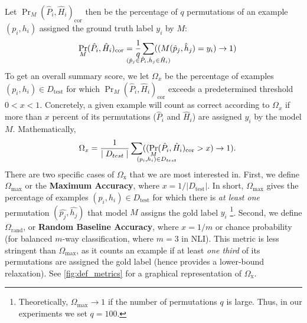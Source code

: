 \documentclass[letterpaper, 12pt]{report}
\begin{document}
Let $\Pr_{M}(\hat{P}_i, \hat{H}_i)_{\text{cor}}$ then be the percentage of $q$ permutations of an example $(p_i, h_i)$ assigned the ground truth label $y_i$ by $M$:
    \begin{align}
    &&\Pr_{M}(\hat{P}_i, \hat{H}_i)_{\text{cor}} =
    \frac{1}{q}\sum_{\mathclap{(\hat{p}_j \in \hat{P}_i, \hat{h}_j \in \hat{H}_i)}}((M(\hat{p}_j, \hat{h}_j) = y_i) \rightarrow 1)
    \end{align}
To get an overall summary score, we let $\Omega_x$ be the percentage of examples $(p_i, h_i) \in D_{\text{test}}$ for which $\Pr_{M}(\hat{P}_i, \hat{H}_i)_{\text{cor}}$ exceeds a predetermined threshold $0 < x < 1$. %
Concretely, a given example will count as correct according to $\Omega_x$ if more than $x$ percent of its permutations ($\hat{P}_i$ and $\hat{H}_i$) are assigned $y_i$ by the model $M$.
Mathematically,
    \begin{align} %
    &&\Omega_x = \frac{1}{\mid D_{test}\mid} \sum_{\mathrlap{(p_i, h_i)\in D_{test}}} ((\Pr_{M}(\hat{P}_i, \hat{H}_i)_{\text{cor}}
    > x) \rightarrow 1).
    \end{align}
There are two specific cases of $\Omega_{\text{x}}$ that we are most interested in. First, we define $\Omega_{\text{max}}$ or the \textbf{Maximum Accuracy}, where $x = 1 / |D_{\text{test}}|$. In short, $\Omega_{\text{max}}$ gives the percentage of examples $(p_i, h_i) \in D_{\text{test}}$ for which there is \textit{at least one} permutation $(\hat{p_j}, \hat{h_j})$ that model $M$ assigns the gold label $y_i$
\footnote{Theoretically, $\Omega_{\text{max}} \rightarrow 1$ if the number of permutations $q$ is large. Thus, in our experiments we set $q=100$.}.
Second, we define $\Omega_{\text{rand}}$, or \textbf{Random Baseline Accuracy}, where $x = 1 / m$ or chance probability (for balanced $m$-way classification, where $m=3$ in NLI). This metric is less stringent than $\Omega_{\text{max}}$, as it counts an example if at least \textit{one third} of its permutations are assigned the gold label (hence provides a lower-bound relaxation). See \autoref{fig:def_metrics} for a graphical representation of $\Omega_{\text{x}}$.
\end{document}
